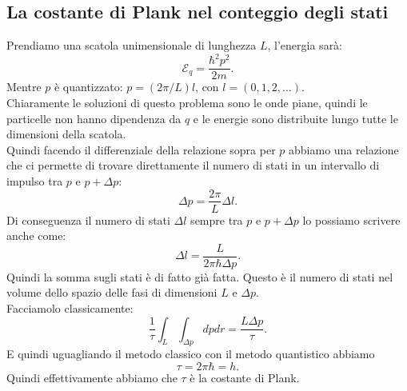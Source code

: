 \subsection{La costante di Plank nel conteggio degli stati}%
Prendiamo una scatola unimensionale di lunghezza $L$, l'energia sarà:
\[
	\mathcal{E}_{q} = \frac{\hbar^2 p^2}{2m}
.\] 
Mentre $p$ è quantizzato: $p = \left( 2\pi /L  \right) l$, con $l = \left( 0,1,2,\ldots \right)$. \\
Chiaramente le soluzioni di questo problema sono le onde piane, quindi le particelle non hanno dipendenza da $q$ e le energie sono distribuite lungo tutte le dimensioni della scatola.\\
Quindi facendo il differenziale della relazione sopra per $p$ abbiamo una relazione che ci permette di trovare direttamente il numero di stati in un intervallo di impulso tra $p$ e  $p + \Delta p$:
\[
	\Delta p = \frac{2\pi}{L}\Delta l
.\] 
Di conseguenza il numero di stati $\Delta l$ sempre tra $p$ e $p + \Delta p$ lo possiamo scrivere anche come:
\[
	\Delta l = \frac{L}{2\pi \hbar\Delta p}
.\]
Quindi la somma sugli stati è di fatto già fatta. Questo è il numero di stati nel volume dello spazio delle fasi di dimensioni $L$ e $\Delta p$.\\
Facciamolo classicamente:
\[
	\frac{1}{\tau} \int_{L}\int_{\Delta p} dp dr = \frac{L \Delta p}{\tau}
.\]  
E quindi uguagliando il metodo classico con il metodo quantistico abbiamo 
\[
	\tau = 2\pi\hbar = h
.\]
Quindi effettivamente abbiamo che  $\tau$ è la costante di Plank. \\



